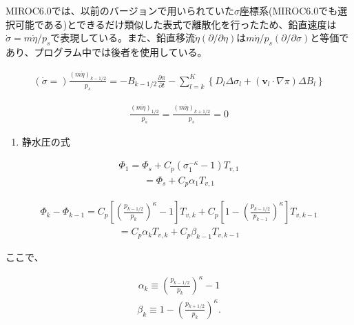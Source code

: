 MIROC6.0では、以前のバージョンで用いられていた\(\sigma\)座標系(MIROC6.0でも選択可能である)とできるだけ類似した表式で離散化を行ったため、鉛直速度は\(\dot{\sigma}=m\dot{\eta}/p_s\)で表現している。また、鉛直移流\(\dot{\eta}(\partial/\partial\eta)\)は\(m\dot{\eta}/p_s(\partial/\partial\sigma)\)と等価であり、プログラム中では後者を使用している。

\begin{eqnarray}
  \left(\dot{\sigma}=\right)\frac{(m\dot{\eta})_{k-1/2}}{p_s}
 = - B_{k-1/2} \frac{\partial \pi}{\partial t}
   - \sum_{l=k}^{K}\left\{ D_l \Delta\sigma_l + ({\mathbf{v}}_l \cdot \nabla \pi)\Delta B_l \right\}
\end{eqnarray}

\begin{eqnarray}
  \frac{(m\dot{\eta})_{1/2}}{p_s} = \frac{(m\dot{\eta})_{k+1/2}}{p_s} = 0
\end{eqnarray}

\begin{enumerate}
\def\labelenumi{\arabic{enumi}.}
\setcounter{enumi}{1}
\tightlist
\item
  静水圧の式
\end{enumerate}

\begin{eqnarray}
 \Phi_{1}  =  \Phi_{s} + C_{p} ( \sigma_{1}^{-\kappa} - 1  ) T_{v,1}
\end{eqnarray} \begin{eqnarray}
           =  \Phi_{s} + C_{p} \alpha_{1} T_{v,1} 
\end{eqnarray}

\begin{eqnarray}
 \Phi_k - \Phi_{k-1} 
   =  C_{p}
   \left[ \left( \frac{ p_{k-1/2} }{ p_k } \right)^{\kappa}
          - 1 \right] T_{v,k} 
       + C_{p}
   \left[ 1- 
         \left( \frac{ p_{k-1/2} }{ p_{k-1} } \right)^{\kappa}
              \right] T_{v,k-1}
\end{eqnarray} \begin{eqnarray}
   =    C_{p} \alpha_k T_{v,k} + C_{p} \beta_{k-1} T_{v,k-1}
\end{eqnarray}

ここで、

\begin{eqnarray}
 \alpha_k \equiv \left( \frac{ p_{k-1/2} }
                               { p_k } \right)^{\kappa} -1
\end{eqnarray} \begin{eqnarray} \beta_k \equiv  1- \left( \frac{ p_{k+1/2} }
                               { p_k } \right)^{\kappa} .
\end{eqnarray}

